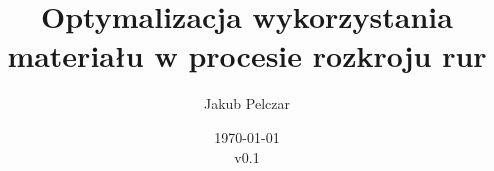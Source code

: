 \documentclass[11pt,a4paper]{article}
\title{Optymalizacja wykorzystania materiału w procesie rozkroju rur}
\author{Jakub Pelczar}
\date{\today\\v0.1}
\begin{document}
\maketitle


\nocite{GilmoreGomoryV1Article}
\nocite{GilmoreGomoryV2Article}
\nocite{ChvatalBook}
\nocite{GauArticle}
\nocite{DyckhoffLPArticle}
\nocite{DyckhoffTyArticle}
\nocite{CerqueiraArticle}
\nocite{GoulimisArticle}
\nocite{HaesslerArticle}
\nocite{WojdaLecture}



\end{document}
